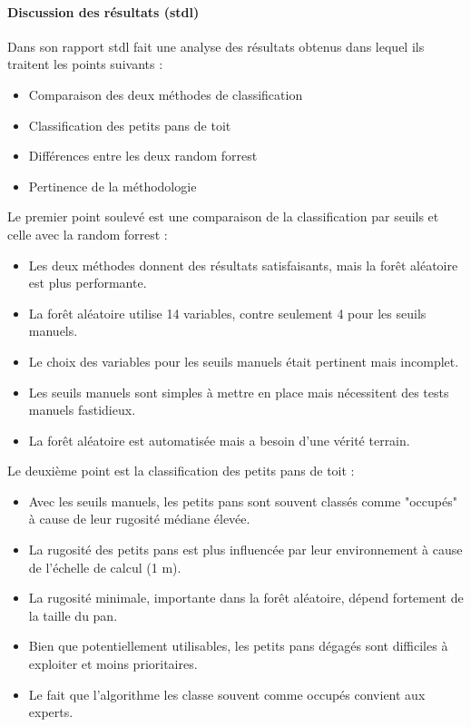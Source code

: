 {{\paragraph{Discussion des résultats (\acrshort{stdl})}
\par{Dans son rapport \acrshort{stdl} fait une analyse des résultats obtenus dans lequel ils traitent les points suivants :
\begin{itemize}
    \item Comparaison des deux méthodes de classification
    \item Classification des petits pans de toit
    \item Différences entre les deux random forrest
    \item Pertinence de la méthodologie
\end{itemize}
\par{Le premier point soulevé est une comparaison de la classification par seuils et celle avec la random forrest :}
\begin{itemize}
    \item Les deux méthodes donnent des résultats satisfaisants, mais la forêt aléatoire est plus performante.
    \item La forêt aléatoire utilise 14 variables, contre seulement 4 pour les seuils manuels.
    \item Le choix des variables pour les seuils manuels était pertinent mais incomplet.
    \item Les seuils manuels sont simples à mettre en place mais nécessitent des tests manuels fastidieux.
    \item La forêt aléatoire est automatisée mais a besoin d'une vérité terrain.
\end{itemize}
\par{Le deuxième point est la classification des petits pans de toit :}
\begin{itemize}
    \item Avec les seuils manuels, les petits pans sont souvent classés comme "occupés" à cause de leur rugosité médiane élevée.
    \item La rugosité des petits pans est plus influencée par leur environnement à cause de l'échelle de calcul (1 m).
    \item La rugosité minimale, importante dans la forêt aléatoire, dépend fortement de la taille du pan.
    \item Bien que potentiellement utilisables, les petits pans dégagés sont difficiles à exploiter et moins prioritaires.
    \item Le fait que l'algorithme les classe souvent comme occupés convient aux experts.
\end{itemize}

}}}
